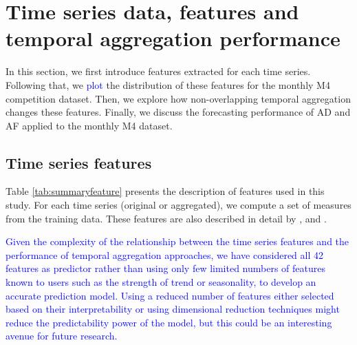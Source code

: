 \documentclass[preprint, 3p,
authoryear]{elsarticle} %
\begin{document}
\hypertarget{tsfeatures}{%
\section{Time series data, features and temporal aggregation
performance}\label{tsfeatures}}

In this section, we first introduce features extracted for each time
series. Following that, we \textcolor{blue}{plot} the distribution of
these features for the monthly M4 competition dataset. Then, we explore
how non-overlapping temporal aggregation changes these features.
Finally, we discuss the forecasting performance of AD and AF applied to
the monthly M4 dataset.

\hypertarget{time-series-features}{%
\subsection{Time series features}\label{time-series-features}}

Table \ref{tab:summaryfeature} presents the description of features used
in this study. For each time series (original or aggregated), we compute
a set of measures from the training data. These features are also
described in detail by \citet{wang2009rule}, \citet{hyndman2015large}
and \citet{hyndman2021forecasting}.

\textcolor{blue}{Given the complexity of the relationship between the time series features and the performance of temporal aggregation approaches, we have considered all 42 features as predictor rather than using only few limited numbers of features known to users such as the strength of trend or seasonality, to develop an accurate prediction model. Using a reduced number of features either selected based on their interpretability or using dimensional reduction techniques might reduce the predictability power of the model, but this could be an interesting avenue for future research.}
\end{document}
